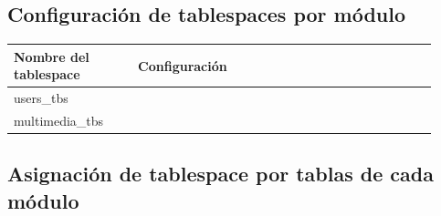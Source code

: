 \documentclass{article}
\def\arraystretch{1}
\begin{document}
\subsection{Configuración de tablespaces por módulo}

{
  \setlength\tabcolsep{3.5mm}
  \def\arraystretch{2}          %
  \begin{longtable}{
    |p{0.27\linewidth}
    |p{0.65\linewidth}|}
  \hline
  \textbf{Nombre del tablespace} & 
  \textbf{Configuración}
  \\ \hline
  users\_tbs & 
  \\ \hline
  multimedia\_tbs & 
  \\ \hline
  \end{longtable}
}

\subsection{Asignación de tablespace por tablas de cada módulo}
\end{document}
